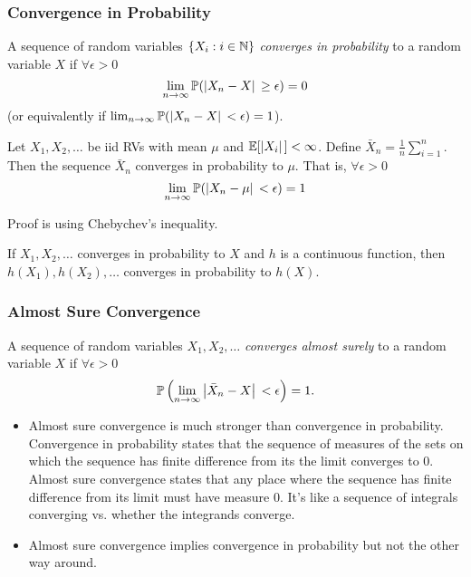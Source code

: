 \subsubsection{Convergence in Probability}
\begin{definition}
    A sequence of random variables $\{X_i: i \in \mathbb{N} \}$ \emph{converges in probability} to a random variable $X$ if $ \forall \epsilon > 0$
    \[
        \lim_{n\to\infty}\mathbb{P}{}(\left\vert{} X_n - X \right\vert{} \geq \epsilon) = 0
    \]
    (or equivalently if $\lim_{n\to\infty}\mathbb{P}{}(\left\vert{} X_n - X \right\vert{} < \epsilon) = 1$).
\end{definition}

\begin{theorem}
    Let $X_1, X_2, \dots$ be iid RVs with mean $\mu$ and $\mathbb{E}{}[\left\vert{} X_i \right\vert{}] < \infty$. Define $\bar{X}_n = \frac1n \sum_{i=1}^n$. Then the sequence $\bar{X}_n$ converges in probability to $\mu$. That is, $\forall \epsilon > 0$
    \[
        \lim_{n\to\infty} \mathbb{P}{}(\left\vert{} X_n - \mu \right\vert{} < \epsilon) = 1
    \]
\end{theorem}

Proof is using Chebychev's inequality.

\begin{theorem}
    If $X_1, X_2, \dots$ converges in probability to $X$ and $h$ is a continuous function, then $h(X_1), h(X_2), \dots$ converges in probability to $h(X)$.
\end{theorem}

\subsubsection{Almost Sure Convergence}

\begin{definition}
    A sequence of random variables $X_1, X_2, \dots$ \emph{converges almost surely} to a random variable $X$ if $ \forall \epsilon > 0$
    \[
        \mathbb{P}{}\left(\lim_{n\to\infty} \left\vert{} \bar{X}_n - X \right\vert{} < \epsilon\right) = 1.
    \]
\end{definition}

\begin{comments}
    \mbox{}
    \begin{itemize}[+]
        \item Almost sure convergence is much stronger than convergence in probability. Convergence in probability states that the sequence of measures of the sets on which the sequence has finite difference from its the limit converges to 0. Almost sure convergence states that any place where the sequence has finite difference from its limit must have measure 0. It's like a sequence of integrals converging vs. whether the integrands converge.
        \item Almost sure convergence implies convergence in probability but not the other way around.
    \end{itemize}
\end{comments}

